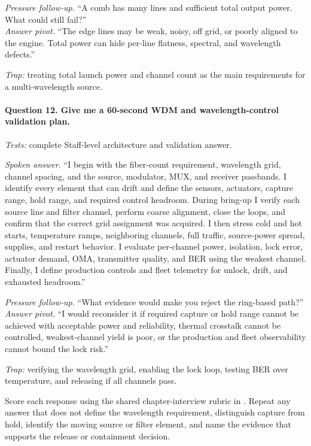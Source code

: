 \textit{Pressure follow-up.} ``A comb has many lines and sufficient total output
power. What could still fail?''\\
\textit{Answer pivot.} ``The edge lines may be weak, noisy, off grid, or poorly
aligned to the engine. Total power can hide per-line flatness, spectral, and
wavelength defects.''

\textit{Trap:} treating total launch power and channel count as the main
requirements for a multi-wavelength source.

\paragraph{Question 12. Give me a 60-second WDM and wavelength-control validation
plan.}
\textit{Tests:} complete Staff-level architecture and validation answer.

\textit{Spoken answer.}
``I begin with the fiber-count requirement, wavelength grid, channel spacing,
and the source, modulator, MUX, and receiver passbands. I identify every element
that can drift and define the sensors, actuators, capture range, hold range, and
required control headroom. During bring-up I verify each source line and filter
channel, perform coarse alignment, close the loops, and confirm that the correct
grid assignment was acquired. I then stress cold and hot starts, temperature
ramps, neighboring channels, full traffic, source-power spread, supplies, and
restart behavior. I evaluate per-channel power, isolation, lock error, actuator
demand, OMA, transmitter quality, and BER using the weakest channel. Finally, I
define production controls and fleet telemetry for unlock, drift, and exhausted
headroom.''

\textit{Pressure follow-up.} ``What evidence would make you reject the ring-based
path?''\\
\textit{Answer pivot.} ``I would reconsider it if required capture or hold range
cannot be achieved with acceptable power and reliability, thermal crosstalk
cannot be controlled, weakest-channel yield is poor, or the production and fleet
observability cannot bound the lock risk.''

\textit{Trap:} verifying the wavelength grid, enabling the lock loop, testing
BER over temperature, and releasing if all channels pass.

Score each response using the shared chapter-interview rubric in
. Repeat any answer that does not define the
wavelength requirement, distinguish capture from hold, identify the moving
source or filter element, and name the evidence that supports the release or
containment decision.

